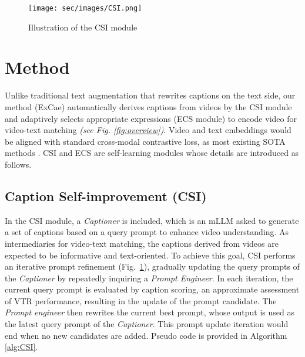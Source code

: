 \begin{figure}[t]
\centering
\texttt{[image: sec/images/CSI.png]} 
 \vspace{-0.5em}
\caption{Illustration of the CSI module}
\label{fig:CSI}
\end{figure}

\section{Method}
Unlike traditional text augmentation that rewrites captions on the text side, our method (ExCae) automatically derives captions from videos by the CSI module and adaptively selects appropriate expressions (ECS module) to encode video for video-text matching \textit{(see Fig. \ref{fig:overview})}. Video and text embeddings would be aligned with standard cross-modal contrastive loss, as most existing SOTA methods \cite{liu2022ts2,luo2022clip4clip}. CSI and ECS are self-learning modules whose details are introduced as follows. 

\subsection{Caption Self-improvement (CSI)}
In the CSI module, a \textit{Captioner} is included, which is an mLLM asked to generate a set of captions based on a query prompt to enhance video understanding. As intermediaries for video-text matching, the captions derived from videos are expected to be informative and text-oriented. To achieve this goal, CSI performs an iterative prompt refinement (Fig.~\ref{fig:CSI}), gradually updating the query prompts of the \textit{Captioner} by repeatedly inquiring a \textit{Prompt Engineer}. 
In each iteration, the current query prompt is evaluated by caption scoring, an approximate assessment of VTR performance, resulting in the update of the prompt candidate.
The \textit{Prompt engineer} then rewrites the current best prompt, whose output is used as the latest query prompt of the \textit{Captioner}. This prompt update iteration would end when no new candidates are added. Pseudo code is provided in Algorithm \ref{alg:CSI}. 










